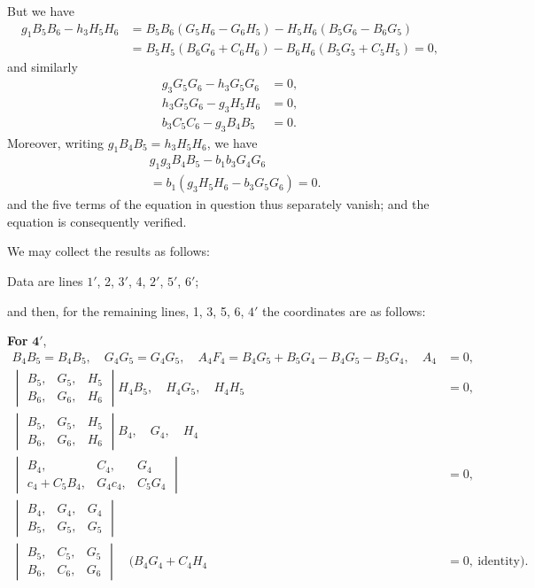 \documentclass[11pt,a4paper]{article}
\begin{document}
\newpage
\setcounter{page}{321}

But we have
\begin{align*}
g_{1}B_{5}B_{6} - h_{3}H_{5}H_{6} &= B_{5}B_{6}(G_{5}H_{6} - G_{6}H_{5}) - H_{5}H_{6}(B_{5}G_{6} - B_{6}G_{5})\\
&= B_{5}H_{5}(B_{6}G_{6} + C_{6}H_{6}) - B_{6}H_{6}(B_{5}G_{5} + C_{5}H_{5}) = 0,
\end{align*}
and similarly
\begin{align*}
g_{3}G_{5}G_{6} - h_{3}G_{5}G_{6} &= 0,\\
h_{3}G_{5}G_{6} - g_{3}H_{5}H_{6} &= 0,\\
b_{3}C_{5}C_{6} - g_{3}B_{4}B_{5} &= 0.
\end{align*}
Moreover, writing $g_{1}B_{4}B_{5} = h_{3}H_{5}H_{6}$, we have
\begin{align*}
&g_{1}g_{3}B_{4}B_{5} - b_{1}b_{3}G_{4}G_{6}\\
&= b_{1}(g_{3}H_{5}H_{6} - b_{3}G_{5}G_{6}) = 0.
\end{align*}
and the five terms of the equation in question thus separately vanish; and the equation is consequently verified.

We may collect the results as follows:

Data are lines $1'$, 2, $3'$, 4, $2'$, $5'$, $6'$;

and then, for the remaining lines, 1, 3, 5, 6, $4'$ the coordinates are as follows:

\textbf{For} $\mathbf{4'}$,
\begin{align*}
B_{4}B_{5} = B_{4}B_{5},\quad G_{4}G_{5} = G_{4}G_{5},\quad A_{4}F_{4} = B_{4}G_{5}+B_{5}G_{4}-B_{4}G_{5}-B_{5}G_{4},\quad A_{4} &= 0,\\
\begin{vmatrix} B_{5}, & G_{5}, & H_{5}\\ B_{6}, & G_{6}, & H_{6}\end{vmatrix} H_{4}B_{5},\quad H_{4}G_{5},\quad H_{4}H_{5} &= 0,\\
\begin{vmatrix} B_{5}, & G_{5}, & H_{5}\\ B_{6}, & G_{6}, & H_{6}\end{vmatrix} B_{4},\quad G_{4},\quad H_{4}\\
\begin{vmatrix} B_{4}, & C_{4}, & G_{4}\\ c_{4}+C_{5}B_{4}, & G_{4}c_{4}, & C_{5}G_{4}\end{vmatrix} &= 0,\\
\begin{vmatrix} B_{4}, & G_{4}, & G_{4}\\ B_{5}, & G_{5}, & G_{5}\end{vmatrix}\\
\begin{vmatrix} B_{5}, & C_{5}, & G_{5}\\ B_{6}, & C_{6}, & G_{6}\end{vmatrix} \quad (B_{4}G_{4}+C_{4}H_{4} &= 0,\ \text{identity}).
\end{align*}
\end{document}
